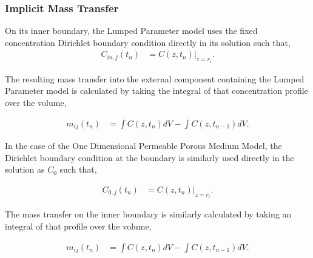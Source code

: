 \subsubsection{Implicit Mass Transfer}

On its inner boundary, the Lumped Parameter model uses the fixed concentration  
Dirichlet boundary condition directly in its solution such that, 
\begin{align}
C_{in,j}(t_n) &= C(z, t_n)|_{z=r_i}.
\end{align}

The resulting mass transfer into the external component containing the Lumped 
Parameter model is calculated by taking the integral of that concentration 
profile over the volume, 

\begin{align}
m_{ij}(t_n) &=\int C(z,t_n)dV - \int C(z, t_{n-1})dV.
\end{align}


In the case of the One Dimensional Permeable Porous Medium Model, 
the Dirichlet boundary condition at the boundary is similarly used directly in 
the solution as $C_0$ such that,

\begin{align}
  C_{0,j}(t_n) &= C(z, t_n)|_{z=r_i}.
\end{align}

The mass transfer on the inner boundary is similarly calculated by taking an 
integral of that profile over the volume,

\begin{align}
m_{ij}(t_n) &=\int C(z,t_n)dV - \int C(z, t_{n-1})dV.
\end{align}
